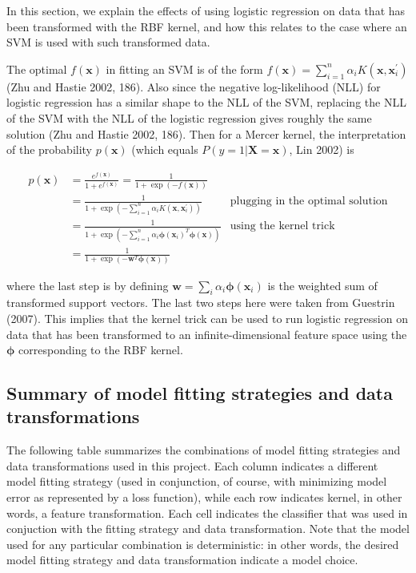 \documentclass[letterpaper, 11pt]{article}
\newcommand{\vect}[1]{\boldsymbol{#1}}
\begin{document}
In this section, we explain the effects of using logistic regression on data that has been transformed with the RBF kernel, and how this relates to the case where an SVM is used with such transformed data.

The optimal $f(\vect{x})$ in fitting an SVM is of the form $f(\vect{x}) = \sum_{i=1}^{n} \alpha_i K(\vect{x}, \vect{x}_i^\prime)$ (Zhu and Hastie 2002, 186). Also since the negative log-likelihood (NLL) for logistic regression has a similar shape to the NLL of the SVM, replacing the NLL of the SVM with the NLL of the logistic regression gives roughly the same solution (Zhu and Hastie 2002, 186). Then for a Mercer kernel, the interpretation of the probability $p(\vect{x})$ (which equals $P(y = 1 | \vect{X} = \vect{x})$, Lin 2002) is

\begin{align*}
  p(\vect{x}) & = \frac{e^{f(\vect{x})}}{1 + e^{f(\vect{x})}} = \frac{1}{1 + \exp({-f(\vect{x})})} & \\
  & = \frac{1}{1 + \exp(-\sum_{i=1}^{n} \alpha_i K(\vect{x}, \vect{x}_i^\prime))} & \text{plugging in the optimal solution} \\
  & = \frac{1}{1 + \exp(-\sum_{i=1}^{n} \alpha_i \vect{\phi}(\vect{x}_i)^T \vect{\phi}(\vect{x}))} & \text{using the kernel trick} \\
  & = \frac{1}{1 + \exp(-\vect{w}^T \vect{\phi}(\vect{x}))} &
\end{align*}

where the last step is by defining $\vect{w} = \sum_{i} \alpha_i \vect{\phi}(\vect{x}_i)$ is the weighted sum of transformed support vectors. The last two steps here were taken from Guestrin (2007). This implies that the kernel trick can be used to run logistic regression on data that has been transformed to an infinite-dimensional feature space using the $\vect{\phi}$ corresponding to the RBF kernel.

\subsection{Summary of model fitting strategies and data transformations}

The following table summarizes the combinations of model fitting strategies and data transformations used in this project. Each column indicates a different model fitting strategy (used in conjunction, of course, with minimizing model error as represented by a loss function), while each row indicates kernel, in other words, a feature transformation. Each cell indicates the classifier that was used in conjuction with the fitting strategy and data transformation. Note that the model used for any particular combination is deterministic: in other words, the desired model fitting strategy and data transformation indicate a model choice.
\end{document}
